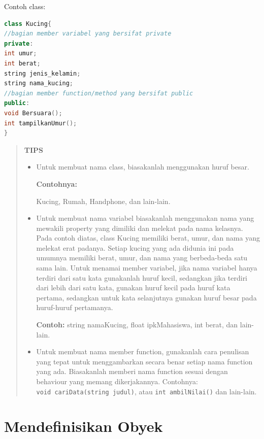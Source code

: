 Contoh class:

\begin{lstlisting}[language=c++, caption= contoh class]
class Kucing{
//bagian member variabel yang bersifat private
private:
int umur;
int berat;
string jenis_kelamin;
string nama_kucing;
//bagian member function/method yang bersifat public
public:
void Bersuara();
int tampilkanUmur();
}
\end{lstlisting}

\begin{quotation}
		\textbf{TIPS}
			\begin{itemize}
				\item Untuk membuat
				nama class, biasakanlah menggunakan huruf besar.
				
				\textbf{ Contohnya:}
				
				 Kucing,
				Rumah, Handphone, dan lain-lain.
				
				\item Untuk membuat nama
				variabel biasakanlah menggunakan nama yang mewakili property yang
				dimiliki dan melekat pada nama kelasnya. Pada contoh diatas, class
				Kucing memiliki berat, umur, dan nama yang melekat erat padanya. Setiap
				kucing yang ada didunia ini pada umumnya memiliki berat, umur, dan nama
				yang berbeda-beda satu sama lain. Untuk menamai member variabel, jika
				nama variabel hanya terdiri dari satu kata gunakanlah huruf kecil,
				sedangkan jika terdiri dari lebih dari satu kata, gunakan huruf kecil
				pada huruf kata pertama, sedangkan untuk kata selanjutnya gunakan huruf
				besar pada huruf-huruf pertamanya.
				
				 \textbf{Contoh: }string namaKucing, float
				ipkMahasiswa, int berat, dan lain-lain.
				
				\item Untuk membuat
				nama member function, gunakanlah cara penulisan yang tepat untuk
				menggambarkan secara benar setiap nama function yang ada. Biasakanlah
				memberi nama function sesuai dengan behaviour yang memang dikerjakannya.
				Contohnya: \texttt{void\ cariData(string\ judul)}, atau
				\texttt{int\ ambilNilai()} dan lain-lain.
			\end{itemize}
			
	\end{quotation}


\section{Mendefinisikan Obyek}\label{mendefinisikan-obyek}

